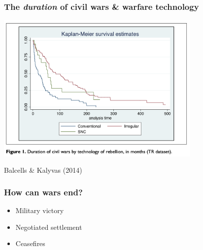 \documentclass[aspectratio=43]{beamer}
\begin{document}
\begin{frame}
\frametitle{The \textit{duration} of civil wars \& warfare technology}
\centering

\includegraphics[width = 0.75\textwidth]{img/balcells_kalyvas_duration}

\begin{itemize}
\end{itemize}

{\scriptsize Balcells \& Kalyvas (2014)}

\end{frame}


\begin{frame}
\frametitle{How can wars end?}
\centering

\begin{itemize}[<+->]
  \item Military victory
  \item Negotiated settlement
  \item Ceasefires
\end{itemize}

\end{frame}

\end{document}
